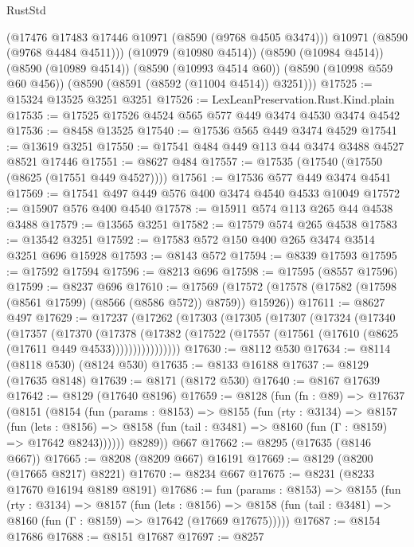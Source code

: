 \begin{lexlean}{RustStd}
\begin{coremodule}
        (@17476 @17483 @17446 @10971 (@8590 (@9768 @4505 @3474)))
        @10971
        (@8590 (@9768 @4484 @4511)))
      (@10979 (@10980 @4514))
      (@8590 (@10984 @4514))
      (@8590 (@10989 @4514))
      (@8590 (@10993 @4514 @60))
      (@8590 (@10998 @559 @60 @456))
      (@8590 (@8591 (@8592 (@11004 @4514)) @3251)))
@17525 := @15324 @13525 @3251 @3251
@17526 := LexLeanPreservation.Rust.Kind.plain
@17535 := @17525 @17526 @4524 @565 @577 @449 @3474 @4530 @3474 @4542
@17536 := @8458 @13525
@17540 := @17536 @565 @449 @3474 @4529
@17541 := @13619 @3251
@17550 := @17541 @484 @449 @113 @44 @3474 @3488 @4527 @8521 @17446
@17551 := @8627 @484
@17557 := @17535 (@17540 (@17550 (@8625 (@17551 @449 @4527))))
@17561 := @17536 @577 @449 @3474 @4541
@17569 := @17541 @497 @449 @576 @400 @3474 @4540 @4533 @10049
@17572 := @15907 @576 @400 @4540
@17578 := @15911 @574 @113 @265 @44 @4538 @3488
@17579 := @13565 @3251
@17582 := @17579 @574 @265 @4538
@17583 := @13542 @3251
@17592 := @17583 @572 @150 @400 @265 @3474 @3514 @3251 @696 @15928
@17593 := @8143 @572
@17594 := @8339 @17593
@17595 := @17592 @17594
@17596 := @8213 @696
@17598 := @17595 (@8557 @17596)
@17599 := @8237 @696
@17610 := @17569
    (@17572 (@17578 (@17582 (@17598 (@8561 @17599) (@8566 (@8586 @572)) @8759)) @15926))
@17611 := @8627 @497
@17629 := @17237
    (@17262
      (@17303
        (@17305
          (@17307
            (@17324
              (@17340
                (@17357
                  (@17370
                    (@17378
                      (@17382
                        (@17522 (@17557 (@17561 (@17610 (@8625 (@17611 @449 @4533))))))))))))))))
@17630 := @8112 @530
@17634 := @8114 (@8118 @530) (@8124 @530)
@17635 := @8133 @16188
@17637 := @8129 (@17635 @8148)
@17639 := @8171 (@8172 @530)
@17640 := @8167 @17639
@17642 := @8129 (@17640 @8196)
@17659 := @8128
    (fun (fn : @89) =>
    @17637
      (@8151
        (@8154
          (fun (params : @8153) =>
          @8155
            (fun (rty : @3134) =>
            @8157
              (fun (lets : @8156) =>
              @8158 (fun (tail : @3481) => @8160 (fun (Γ : @8159) => @17642 @8243))))))
        @8289))
    @667
@17662 := @8295 (@17635 (@8146 @667))
@17665 := @8208 (@8209 @667) @16191
@17669 := @8129 (@8200 (@17665 @8217) @8221)
@17670 := @8234 @667
@17675 := @8231 (@8233 @17670 @16194 @8189 @8191)
@17686 := fun (params : @8153) =>
  @8155
    (fun (rty : @3134) =>
    @8157
      (fun (lets : @8156) =>
      @8158 (fun (tail : @3481) => @8160 (fun (Γ : @8159) => @17642 (@17669 @17675)))))
@17687 := @8154 @17686
@17688 := @8151 @17687
@17697 := @8257

\end{coremodule}
\end{lexlean}
